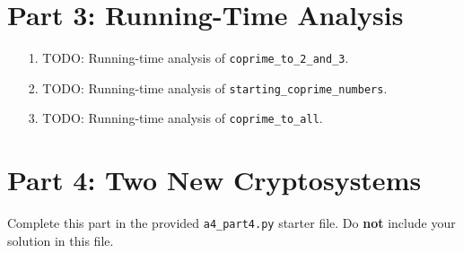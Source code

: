\documentclass[fontsize=11pt]{article}
\begin{document}
\section*{Part 3: Running-Time Analysis}

\begin{enumerate}
\item[1.]
TODO: Running-time analysis of \texttt{coprime\_to\_2\_and\_3}.

\item[2.]
TODO: Running-time analysis of \texttt{starting\_coprime\_numbers}.

\item[3.]
TODO: Running-time analysis of \texttt{coprime\_to\_all}.
\end{enumerate}

\section*{Part 4: Two New Cryptosystems}

Complete this part in the provided \texttt{a4\_part4.py} starter file.
Do \textbf{not} include your solution in this file.
\end{document}

